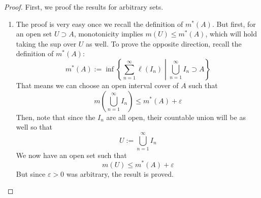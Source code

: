 \documentclass[12pt]{article}
\theoremstyle{plain}
\theoremstyle{definition}
\theoremstyle{remark}
\begin{document}
\begin{proof}
First, we proof the results for arbitrary sets.
\begin{enumerate}
\item The proof is very easy once we recall the definition of $m^*(A)$. But first, for an open set $U\supset A$, monotonicity implies $m(U)\leq m^*(A)$, which will hold taking the sup over $U$ as well. To prove the opposite direction, recall the definition of $m^*(A)$:
\[
    m^*(A) := 
    \inf \left\{ \left.\sum^\infty_{n=1}\ell(I_n) \; 
        \right\rvert\; \bigcup^\infty_{n=1} I_n \supset A\right\}  
\]
That means we can choose an open interval cover of $A$ such that
\[
    m\left(\bigcup^\infty_{n=1} I_n\right) \leq m^*(A) + \varepsilon
\]
Then, note that since the $I_n$ are all open, their countable union will be as well so that
\[
    U:=\bigcup^\infty_{n=1} I_n
\]
We now have an open set such that
\[
    m(U) \leq m^*(A) +\varepsilon
\]
But since $\varepsilon>0$ was arbitrary, the result is proved.


\end{enumerate}
\end{proof}
\end{document}

